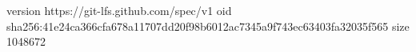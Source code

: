 version https://git-lfs.github.com/spec/v1
oid sha256:41e24ca366cfa678a11707dd20f98b6012ac7345a9f743ec63403fa32035f565
size 1048672
